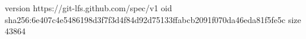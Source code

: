 version https://git-lfs.github.com/spec/v1
oid sha256:6e407c4e5486198d3f7f3d4f84d92d75133ffabcb2091f070da46eda81f5fe5c
size 43864
